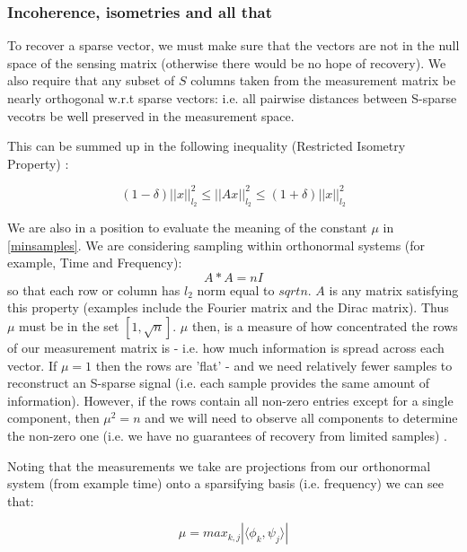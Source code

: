 \documentclass[12pt, a4paper]{article}
\newcommand{\vectornorm}[1]{\left|\left|#1\right|\right|}
\begin{document}
\subsubsection{Incoherence, isometries and all that}
To recover a sparse vector, we must make sure that the vectors are not in the null space of the sensing matrix (otherwise there would be no hope of recovery). We also require that any subset of \(S\) columns taken from the measurement matrix be nearly orthogonal w.r.t sparse vectors: i.e. all pairwise distances between S-sparse vecotrs be well preserved in the measurement space.

This can be summed up in the following inequality (Restricted Isometry Property) \cite{Emma}:

\begin{equation}
\left(1-\delta\right)\vectornorm{x}_{l_2}^2 \leq \vectornorm{Ax}_{l_2}^2 \leq \left(1+\delta\right) \vectornorm{x}_{l_2}^2
\end{equation}
\label{RIP}

We are also in a position to evaluate the meaning of the constant \(\mu\) in \ref{minsamples}. We are considering sampling within orthonormal systems (for example, Time and Frequency):
%
\begin{equation}
A*A = nI
\end{equation}
\label{orthonormal}
%
so that each row or column has \(l_2\) norm equal to \(sqrt{n}\). \(A\) is any matrix satisfying this property (examples include the Fourier matrix and the Dirac matrix). Thus \(\mu\) must be in the set \(\left[1, \sqrt{n}\right]\). \(\mu\) then, is a measure of how concentrated the rows of our measurement matrix is - i.e. how much information is spread across each vector. If \(\mu = 1\) then the rows are 'flat' -  and we need relatively fewer samples to reconstruct an S-sparse signal (i.e. each sample provides the same amount of information). However, if the rows contain all non-zero entries except for a single component, then \(\mu^2 = n\) and we will need to observe all components to determine the non-zero one (i.e. we have no guarantees of recovery from limited samples) \cite{Candes2007}. 

Noting that the measurements we take are projections from our orthonormal system (from example time) onto a sparsifying basis (i.e. frequency) we can see that:

\begin{equation}
\mu = max_{k,j} |\langle \phi_k, \psi_j \rangle |
\end{equation}
\label {mudef}
 
\end{document}
